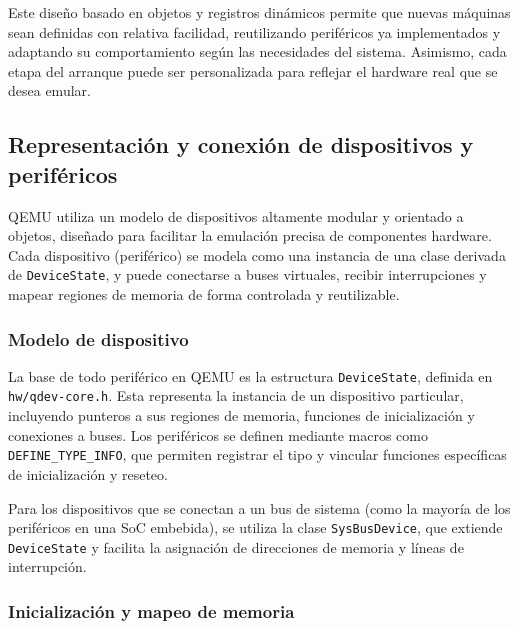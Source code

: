 Este diseño basado en objetos y registros dinámicos permite que nuevas máquinas sean definidas con relativa facilidad, reutilizando periféricos ya implementados y adaptando su comportamiento según las necesidades del sistema. Asimismo, cada etapa del arranque puede ser personalizada para reflejar el hardware real que se desea emular.


\subsection{Representación y conexión de dispositivos y periféricos}
\label{subsec:dispositivos-qemu}

QEMU utiliza un modelo de dispositivos altamente modular y orientado a objetos, diseñado para facilitar la emulación precisa de componentes hardware. Cada dispositivo (periférico) se modela como una instancia de una clase derivada de \texttt{DeviceState}, y puede conectarse a buses virtuales, recibir interrupciones y mapear regiones de memoria de forma controlada y reutilizable.

\subsubsection*{Modelo de dispositivo}

La base de todo periférico en QEMU es la estructura \texttt{DeviceState}, definida en \texttt{hw/qdev-core.h}. Esta representa la instancia de un dispositivo particular, incluyendo punteros a sus regiones de memoria, funciones de inicialización y conexiones a buses. Los periféricos se definen mediante macros como \texttt{DEFINE\_TYPE\_INFO}, que permiten registrar el tipo y vincular funciones específicas de inicialización y reseteo.

Para los dispositivos que se conectan a un bus de sistema (como la mayoría de los periféricos en una SoC embebida), se utiliza la clase \texttt{SysBusDevice}, que extiende \texttt{DeviceState} y facilita la asignación de direcciones de memoria y líneas de interrupción.

\subsubsection*{Inicialización y mapeo de memoria}

